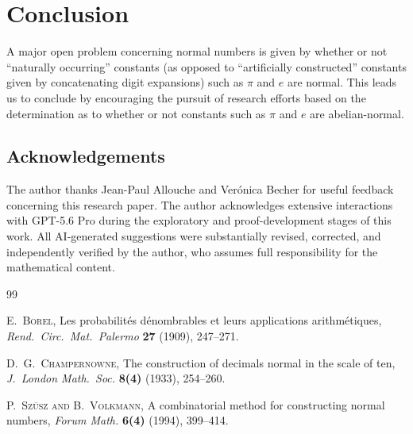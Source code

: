 \documentclass[12pt]{article}
\begin{document}
\section{Conclusion} 
 A major open problem concerning normal numbers is given by whether or not ``naturally occurring'' constants (as opposed to 
 ``artificially constructed'' constants given by concatenating digit expansions) such as $\pi$ and $e$ are normal. This leads us to 
 conclude by encouraging the pursuit of research efforts based on the determination as to whether or not constants such as $\pi$ and 
 $e$ are abelian-normal. 

 \subsection*{Acknowledgements}
 The author thanks Jean-Paul Allouche and Ver\'{o}nica Becher for useful feedback concerning this research paper. 
 The author acknowledges extensive interactions with GPT-5.6 Pro during the exploratory and proof-development stages of this work. All 
 AI-generated suggestions were substantially revised, corrected, and independently verified by the author, who assumes full responsibility 
 for the mathematical content. 

\begin{thebibliography}{99}

 \textsc{E.\ Borel}, 
 Les probabilit{\'e}s d{\'e}nombrables et leurs applications arithm{\'e}tiques, 
 \emph{Rend.\ Circ.\ Mat.\ Palermo} {\bf 27} (1909), 247--271. 

 \textsc{D.\ G.\ Champernowne}, 
 The construction of decimals normal in the scale of ten, 
 \emph{J.\ London Math.\ Soc.} {\bf 8(4)} (1933), 254--260. 

 \textsc{P.\ Sz\"usz and B.\ Volkmann}, 
 A combinatorial method for constructing normal numbers, 
 \emph{Forum Math.} {\bf 6(4)} (1994), 399--414. 

\end{thebibliography}
\end{document}
